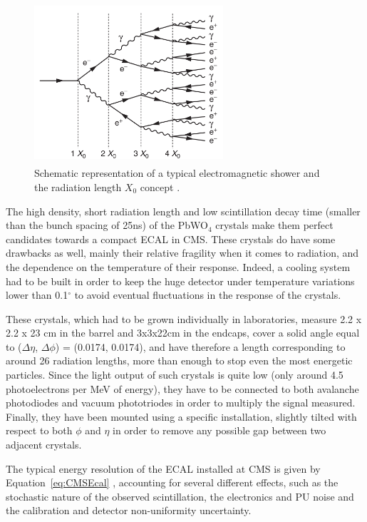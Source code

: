 \documentclass[a4paper, 10pt, openright]{report}
\begin{document}
\begin{figure}[htbp]
\begin{center}
\includegraphics[width=7cm, height=6cm]{figs/EMShowers.png}
\caption{Schematic representation of a typical electromagnetic shower and the radiation length $X_0$ concept \cite{CMSDescription}.}
\label{fig:EMShowers}
\end{center}
\end{figure}

The high density, short radiation length and low scintillation decay time (smaller than the bunch spacing of 25ns) of the PbWO$_4$ crystals make them perfect candidates towards a compact \ac{ECAL} in \ac{CMS}. These crystals do have some drawbacks as well, mainly their relative fragility when it comes to radiation, and the dependence on the temperature of their response. Indeed, a cooling system had to be built in order to keep the huge detector under temperature variations lower than 0.1$^\circ$ to avoid eventual fluctuations in the response of the crystals.

These crystals, which had to be grown individually in laboratories, measure 2.2 x 2.2 x 23 cm in the barrel and 3x3x22cm in the endcaps, cover a solid angle equal to ($\Delta \eta$, $\Delta \phi$) = (0.0174, 0.0174), and have therefore a length corresponding to around 26 radiation lengths, more than enough to stop even the most energetic particles. Since the light output of such crystals is quite low (only around 4.5 photoelectrons per MeV of energy), they have to be connected to both avalanche photodiodes and vacuum phototriodes in order to multiply the signal measured. Finally, they have been mounted using a specific installation, slightly tilted with respect to both $\phi$ and $\eta$ in order to remove any possible gap between two adjacent crystals.

The typical energy resolution of the \ac{ECAL} installed at \ac{CMS} is given by Equation~\ref{eq:CMSEcal} \cite{CMSDescription}, accounting for several different effects, such as the stochastic nature of the observed scintillation, the electronics and \ac{PU} noise and the calibration and detector non-uniformity uncertainty.
\end{document}
